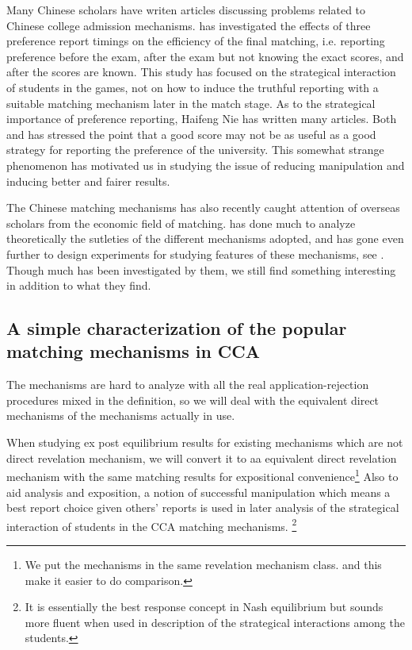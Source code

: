 Many Chinese scholars have writen articles discussing problems related
to Chinese college admission mechanisms. \parencite{Zhong2004} has investigated the effects
of three preference report timings on the efficiency of the final matching, i.e. reporting preference
before the exam, after the exam but not knowing the exact scores,  and
after the scores are known.  This study has focused on the
strategical interaction of students in the games, not on how to induce
the truthful reporting with a suitable matching mechanism later in the match stage.  As to the strategical importance of
preference reporting,  Haifeng Nie has written many articles.  Both \parencite{Nie2007a}
and \parencite{Nie2007b} has stressed the point that a good score may
not be as useful as a good strategy for reporting the preference of
the university. This somewhat strange phenomenon has motivated us
in studying the issue of reducing manipulation and inducing better
and fairer results.

The Chinese  matching mechanisms has also recently caught attention of overseas scholars from
the economic field of matching. \parencite{YanChenJPE} has
done much to analyze theoretically the sutleties of the different
mechanisms adopted, and has gone even further to design experiments
for studying features of these mechanisms,
see \parencite{YanChen2016}. Though much has been investigated by them, we still find something interesting in addition to what they find.



\subsection{A simple characterization of the popular matching mechanisms in CCA}

The mechanisms are hard to analyze with all the real application-rejection procedures mixed in the definition,
so we will deal with the equivalent direct mechanisms of the mechanisms actually in use.

When studying ex post equilibrium results for existing
mechanisms which are not direct revelation mechanism, we will convert it to aa
equivalent direct revelation mechanism with the same matching results for expositional convenience\footnote{We put the
  mechanisms in the same revelation mechanism class. and this make it easier to do
  comparison.}  Also to aid analysis and exposition, a notion of successful
manipulation which means a best report choice given others' reports is
used in later analysis of the strategical interaction of
students in the CCA matching mechanisms. \footnote{ It is
  essentially the best response concept in Nash equilibrium but sounds
  more fluent when used in description of the strategical interactions
  among the students.}

